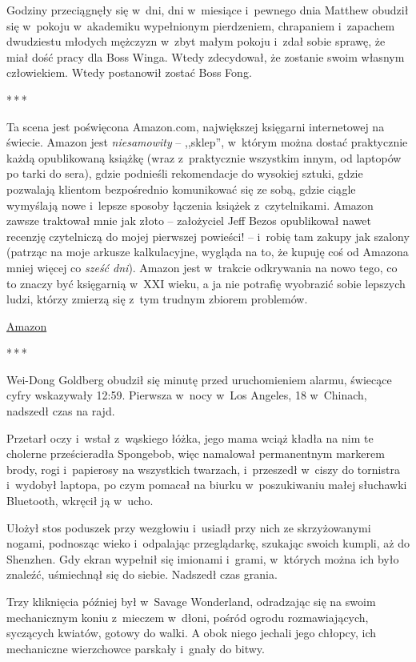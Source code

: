 \documentclass[oneside,polish,11pt,rmheadings]{mwbk}
\newcommand{\threeast}{\par\centerline{*\,*\,*}\medskip\par}
\begin{document}
Godziny przeciągnęły się w~dni, dni w~miesiące i~pewnego dnia Matthew obudził się w~pokoju w~akademiku wypełnionym pierdzeniem, chrapaniem i~zapachem dwudziestu młodych mężczyzn w~zbyt małym pokoju i~zdał sobie sprawę, że miał dość pracy dla Boss Winga. Wtedy zdecydował, że zostanie swoim własnym człowiekiem. Wtedy postanowił zostać Boss Fong. 


\bigskip
\threeast

Ta scena jest poświęcona Amazon.com, największej księgarni internetowej na świecie. Amazon jest \textit{niesamowity }-- ,,sklep'', w~którym można dostać praktycznie każdą opublikowaną książkę (wraz z~praktycznie wszystkim innym, od laptopów po tarki do sera), gdzie podnieśli rekomendacje do wysokiej sztuki, gdzie pozwalają klientom bezpośrednio komunikować się ze sobą, gdzie ciągle wymyślają nowe i~lepsze sposoby łączenia książek z~czytelnikami. Amazon zawsze traktował mnie jak złoto -- założyciel Jeff Bezos opublikował nawet recenzję czytelniczą do mojej pierwszej powieści! -- i~robię tam zakupy jak szalony (patrząc na moje arkusze kalkulacyjne, wygląda na to, że kupuję coś od Amazona mniej więcej co \textit{sześć dni}). Amazon jest w~trakcie odkrywania na nowo tego, co to znaczy być księgarnią w~XXI wieku, a ja nie potrafię wyobrazić sobie lepszych ludzi, którzy zmierzą się z~tym trudnym zbiorem problemów. 


\href{https://www.amazon.com/exec/obidos/ASIN/0765322161/downandoutint-20}{Amazon} 

\bigskip
\threeast

Wei-Dong Goldberg obudził się minutę przed uruchomieniem alarmu, świecące cyfry wskazywały 12:59. Pierwsza w~nocy w~Los Angeles, 18 w~Chinach, nadszedł czas na rajd. 


Przetarł oczy i~wstał z~wąskiego łóżka, jego mama wciąż kładła na nim te cholerne prześcieradła Spongebob, więc namalował permanentnym markerem brody, rogi i~papierosy na wszystkich twarzach, i~przeszedł w~ciszy do tornistra i~wydobył laptopa, po czym pomacał na biurku w~poszukiwaniu małej słuchawki Bluetooth, wkręcił ją w~ucho. 


Ułożył stos poduszek przy wezgłowiu i~usiadł przy nich ze skrzyżowanymi nogami, podnosząc wieko i~odpalając przeglądarkę, szukając swoich kumpli, aż do Shenzhen. Gdy ekran wypełnił się imionami i~grami, w~których można ich było znaleźć, uśmiechnął się do siebie. Nadszedł czas grania. 


Trzy kliknięcia później był w~Savage Wonderland, odradzając się na swoim mechanicznym koniu z~mieczem w~dłoni, pośród ogrodu rozmawiających, syczących kwiatów, gotowy do walki. A obok niego jechali jego chłopcy, ich mechaniczne wierzchowce parskały i~gnały do bitwy. 
\end{document}
